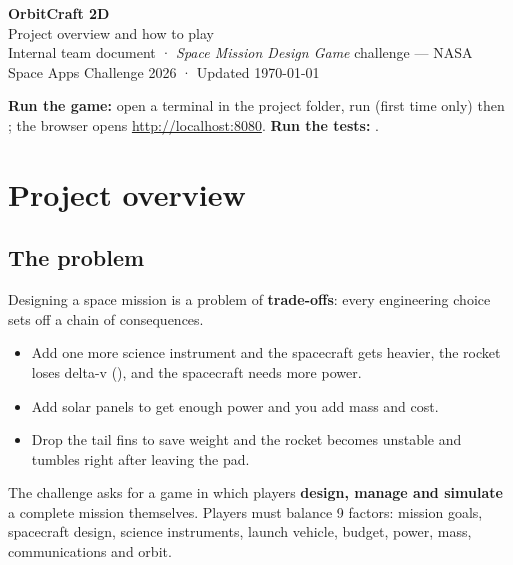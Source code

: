 \documentclass[11pt]{article}
\begin{document}
{\sffamily
{\fontsize{26}{30}\selectfont\bfseries\color{accent} OrbitCraft 2D}\\[2pt]
{\Large\color{ink} Project overview and how to play}\\[6pt]
{\small\color{muted} Internal team document · \emph{Space Mission Design Game} challenge --- NASA Space Apps Challenge 2026 · Updated \today}\par}
\vspace{4pt}{\color{accent}\rule{\linewidth}{1.2pt}}

\begin{tipbox}
\textbf{Run the game:} open a terminal in the project folder, run  (first time only) then ; the browser opens \url{http://localhost:8080}. \quad
\textbf{Run the tests:} .
\end{tipbox}

{\small\setcounter{tocdepth}{2}\tableofcontents}

\section{Project overview}

\subsection{The problem}

Designing a space mission is a problem of \textbf{trade-offs}: every engineering choice sets off a chain of consequences.

\begin{itemize}
  \item Add one more science instrument and the spacecraft gets heavier, the rocket loses delta-v (\dv), and the spacecraft needs more power.
  \item Add solar panels to get enough power and you add mass and cost.
  \item Drop the tail fins to save weight and the rocket becomes unstable and tumbles right after leaving the pad.
\end{itemize}

The challenge asks for a game in which players \textbf{design, manage and simulate} a complete mission themselves. Players must balance 9 factors: mission goals, spacecraft design, science instruments, launch vehicle, budget, power, mass, communications and orbit.
\end{document}

